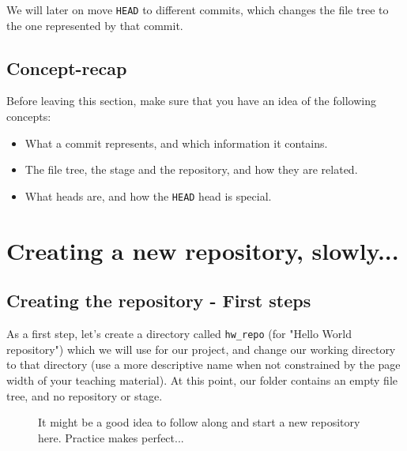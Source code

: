 \documentclass[../main/git_course_main.tex]{subfiles}
\begin{document}
We will later on move \verb$HEAD$ to different commits, which changes the file tree to the one represented by that commit.

\subsection{Concept-recap}

Before leaving this section, make sure that you have an idea of the following concepts:

\begin{itemize}
	\item What a commit represents, and which information it contains.
	\item The file tree, the stage and the repository, and how they are related.
	\item What heads are, and how the \verb$HEAD$ head is special.
\end{itemize}

\section{Creating a new repository, slowly...}


%

\subsection{Creating the repository - First steps}

As a first step, let's create a directory called \verb$hw_repo$ (for "Hello World repository") which we will use for our project, and change our working directory to that directory (use a more descriptive name when not constrained by the page width of your teaching material). 
At this point, our folder contains an empty file tree, and no repository or stage.

\begin{figure}[h!]
\begin{redbox}
It might be a good idea to follow along and start a new repository here.
Practice makes perfect...
\end{redbox}
\end{figure}
\end{document}
